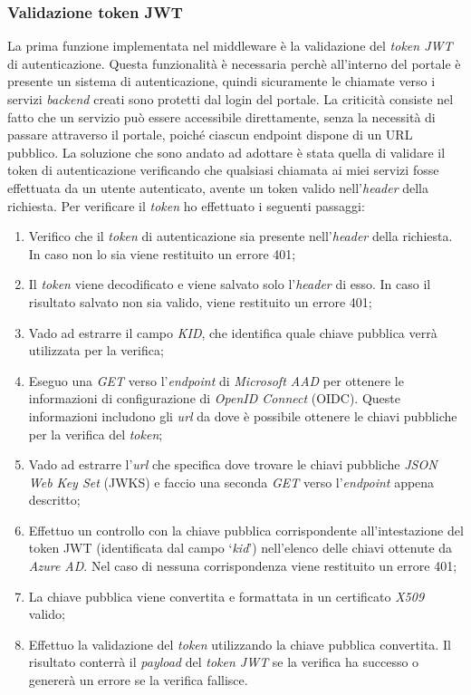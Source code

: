 \subsubsection{Validazione token JWT}
La prima funzione implementata nel middleware è la validazione del \textit{token JWT} di autenticazione. Questa funzionalità è necessaria perchè all'interno del portale è presente un sistema di autenticazione, quindi sicuramente le chiamate verso i servizi \textit{backend} creati sono protetti dal login del portale.
La criticità consiste nel fatto che un servizio può essere accessibile direttamente, senza la necessità di passare attraverso il portale, poiché ciascun endpoint dispone di un URL pubblico.
La soluzione che sono andato ad adottare è stata quella di validare il token di autenticazione verificando che qualsiasi chiamata ai miei servizi fosse effettuata da un utente autenticato, avente un token valido nell'\textit{header} della richiesta.
Per verificare il \textit{token} ho effettuato i seguenti passaggi:
\begin{enumerate}
  \item Verifico che il \textit{token} di autenticazione sia presente nell'\textit{header} della richiesta. In caso non lo sia viene restituito un errore 401;
  \item Il \textit{token} viene decodificato e viene salvato solo l'\textit{header} di esso. In caso il risultato salvato non sia valido, viene restituito un errore 401;
  \item Vado ad estrarre il campo \textit{KID}, che identifica quale chiave pubblica verrà utilizzata per la verifica;
  \item Eseguo una \textit{GET} verso l'\textit{endpoint} di \textit{Microsoft AAD} per ottenere le informazioni di configurazione di \textit{OpenID Connect} (OIDC). 
  Queste informazioni includono gli \textit{url} da dove è possibile ottenere le chiavi pubbliche per la verifica del \textit{token};
  \item Vado ad estrarre l'\textit{url} che specifica dove trovare le chiavi pubbliche \textit{JSON Web Key Set} (JWKS) e faccio una seconda \textit{GET} verso l'\textit{endpoint} appena descritto;
  \item Effettuo un controllo con la chiave pubblica corrispondente all'intestazione del token JWT (identificata dal campo `\textit{kid}') nell'elenco delle chiavi ottenute da \textit{Azure AD}. Nel caso di nessuna corrispondenza viene restituito un errore 401;
  \item La chiave pubblica viene convertita e formattata in un certificato \textit{X509} valido;
  \item Effettuo la validazione del \textit{token} utilizzando la chiave pubblica convertita. Il risultato conterrà il \textit{payload} del \textit{token JWT} se la verifica ha successo o genererà un errore se la verifica fallisce.
\end{enumerate}

